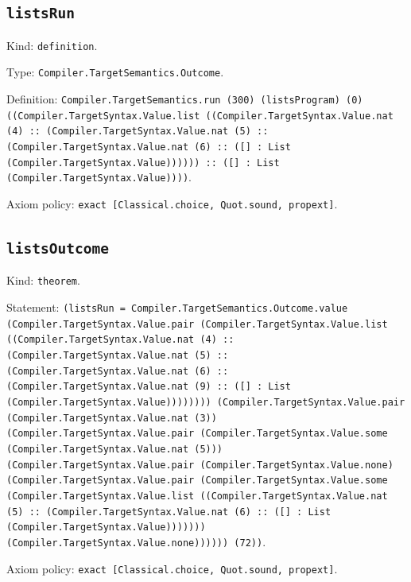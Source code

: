 \documentclass[11pt]{article}
\begin{document}
\subsection*{\texttt{listsRun}}
\noindent Kind: \texttt{definition}.\par
\noindent Type: \texttt{Compiler.TargetSemantics.Outcome}.\par
\noindent Definition: \texttt{Compiler.TargetSemantics.run (300) (listsProgram) (0) ((Compiler.TargetSyntax.Value.list ((Compiler.TargetSyntax.Value.nat (4) :: (Compiler.TargetSyntax.Value.nat (5) :: (Compiler.TargetSyntax.Value.nat (6) :: ([] : List (Compiler.TargetSyntax.Value)))))) :: ([] : List (Compiler.TargetSyntax.Value))))}.\par
\noindent Axiom policy: \texttt{exact [Classical.choice, Quot.sound, propext]}.\par
\subsection*{\texttt{listsOutcome}}
\noindent Kind: \texttt{theorem}.\par
\noindent Statement: \texttt{(listsRun = Compiler.TargetSemantics.Outcome.value (Compiler.TargetSyntax.Value.pair (Compiler.TargetSyntax.Value.list ((Compiler.TargetSyntax.Value.nat (4) :: (Compiler.TargetSyntax.Value.nat (5) :: (Compiler.TargetSyntax.Value.nat (6) :: (Compiler.TargetSyntax.Value.nat (9) :: ([] : List (Compiler.TargetSyntax.Value)))))))) (Compiler.TargetSyntax.Value.pair (Compiler.TargetSyntax.Value.nat (3)) (Compiler.TargetSyntax.Value.pair (Compiler.TargetSyntax.Value.some (Compiler.TargetSyntax.Value.nat (5))) (Compiler.TargetSyntax.Value.pair (Compiler.TargetSyntax.Value.none) (Compiler.TargetSyntax.Value.pair (Compiler.TargetSyntax.Value.some (Compiler.TargetSyntax.Value.list ((Compiler.TargetSyntax.Value.nat (5) :: (Compiler.TargetSyntax.Value.nat (6) :: ([] : List (Compiler.TargetSyntax.Value))))))) (Compiler.TargetSyntax.Value.none)))))) (72))}.\par
\noindent Axiom policy: \texttt{exact [Classical.choice, Quot.sound, propext]}.\par
\end{document}
